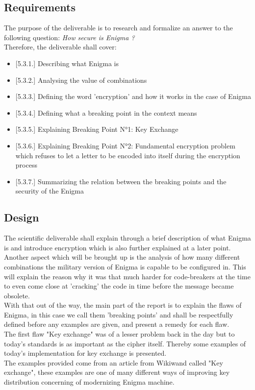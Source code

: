 \documentclass[conference,compsoc]{IEEEtran}
\begin{document}
\subsection{Requirements}
The purpose of the deliverable is to research and formalize an answer to the following question: \emph{How secure is Enigma ?}\\
Therefore, the deliverable shall cover:
\begin{itemize}
    \item{[5.3.1.]} Describing what Enigma is
    \item{[5.3.2.]} Analysing the value of combinations
    \item{[5.3.3.]} Defining the word 'encryption' and how it works in the case of Enigma
    \item{[5.3.4.]} Defining what a breaking point in the context means
    \item{[5.3.5.]} Explaining Breaking Point N°1: Key Exchange
    \item{[5.3.6.]} Explaining Breaking Point N°2: Fundamental encryption problem which refuses to let a letter to be encoded into itself during the encryption process
    \item{[5.3.7.]} Summarizing the relation between the breaking points and the security of the Enigma
\end{itemize}

\subsection{Design}
The scientific deliverable shall explain through a brief description of what Enigma is and introduce encryption which is also further explained at a later point. Another aspect which will be brought up is the analysis of how many different combinations the military version of Enigma is capable to be configured in. This will explain the reason why it was that much harder for code-breakers at the time to even come close at 'cracking' the code in time before the message became obsolete.\\
With that out of the way, the main part of the report is to explain the flaws of Enigma, in this case we call them 'breaking points' and shall be respectfully defined before any examples are given, and present a remedy for each flaw.\\

The first flaw "Key exchange" was of a lesser problem back in the day but to today's standards is as important as the cipher itself. Thereby some examples of today's implementation for key exchange is presented.\\
The examples provided come from an article from Wikiwand called "Key exchange", these examples are one of many different ways of improving key distribution concerning of modernizing Enigma machine.\\ 
\end{document}
